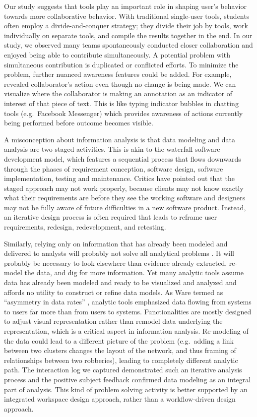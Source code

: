 Our study suggests that tools play an important role in shaping user's
behavior towards more collaborative behavior. With traditional
single-user tools, students often employ a divide-and-conquer strategy;
they divide their job by tools, work individually on separate tools, and
compile the results together in the end. In our study, we observed many
teams spontaneously conducted closer collaboration and enjoyed being
able to contribute simultaneously. A potential problem with simultaneous
contribution is duplicated or conflicted efforts. To minimize the
problem, further nuanced awareness features could be added. For example,
\autocite{Hajizadeh2013} revealed collaborator's action even though no
change is being made. We can visualize where the collaborator is making
an annotation as an indicator of interest of that piece of text. This is
like typing indicator bubbles in chatting tools (e.g.~Facebook
Messenger) which provides awareness of actions currently being performed
before outcome becomes visible.

A misconception about information analysis is that data modeling and
data analysis are two staged activities. This is akin to the waterfall
software development model, which features a sequential process that
flows downwards through the phases of requirement conception, software
design, software implementation, testing and maintenance. Critics have
pointed out that the staged approach may not work properly, because
clients may not know exactly what their requirements are before they see
the working software and designers may not be fully aware of future
difficulties in a new software product. Instead, an iterative design
process is often required that leads to reframe user requirements,
redesign, redevelopment, and retesting.

Similarly, relying only on information that has already been modeled and
delivered to analysts will probably not solve all analytical problems
\autocite{Heuer1999}. It will probably be necessary to look elsewhere
than evidence already extracted, re-model the data, and dig for more
information. Yet many analytic tools assume data has already been
modeled and ready to be visualized and analyzed and affords no utility
to construct or refine data models. As Ware termed as ``asymmetry in
data rates'' \autocite[382]{Ware2012}, analytic tools emphasized data
flowing from systems to users far more than from users to systems.
Functionalities are mostly designed to adjust visual representation
rather than remodel data underlying the representation, which is a
critical aspect in information analysis. Re-modeling of the data could
lead to a different picture of the problem (e.g.~adding a link between
two clusters changes the layout of the network, and thus framing of
relationships between two robberies), leading to completely different
analytic path. The interaction log we captured demonstrated such an
iterative analysis process and the positive subject feedback confirmed
data modeling as an integral part of analysis. This kind of problem
solving activity is better supported by an integrated workspace design
approach, rather than a workflow-driven design approach.

